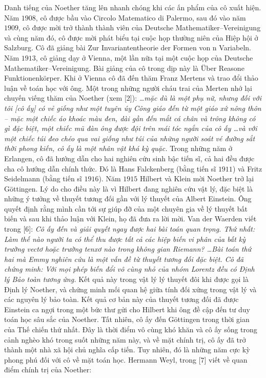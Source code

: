\begin{multicols}{2}
	\vskip 0.05cm
	Danh tiếng của Noether tăng lên nhanh chóng khi các ấn phẩm của cô xuất hiện. Năm $1908$, cô được bầu vào Circolo Matematico di Palermo, sau đó vào năm $1909$, cô được mời trở thành thành viên của Deutsche Mathematiker--Vereinigung và cùng năm đó, cô được mời phát biểu tại cuộc họp thường niên của Hiệp hội ở Salzburg. Cô đã giảng bài Zur Invariantentheorie der Formen von n Variabeln. Năm $1913$, cô giảng dạy ở Vienna, một lần nữa tại một cuộc họp của Deutsche Mathematiker--Vereinigung. Bài giảng của cô trong dịp này là Über Reasone Funktionenkörper. Khi ở Vienna cô đã đến thăm Franz Mertens và trao đổi thảo luận về toán học với ông. Một trong những người cháu trai của Merten nhớ lại chuyến viếng thăm của Noether (xem [$2$]):
	\vskip 0.05cm
	\textit{\ldots mặc dù là một phụ nữ, nhưng đối với tôi [cô ấy] có vẻ giống như một tuyên úy Công giáo đến từ một giáo xứ nông thôn -- mặc một chiếc áo khoác màu đen, dài gần đến mắt cá chân và trông không có gì đặc biệt, một chiếc mũ đàn ông được đội trên mái tóc ngắn của cô ấy \ldots và với một chiếc túi đeo chéo qua vai giống như túi của những người soát vé đường sắt thời phong kiến, cô ấy là một nhân vật khá kỳ quặc.}
	\vskip 0.05cm
	Trong những năm ở Erlangen, cô đã hướng dẫn cho hai nghiên cứu sinh bậc tiến sĩ, cả hai đều được cha cô hướng dẫn chính thức. Đó là Hans Falckenberg (bằng tiến sĩ $1911$) và Fritz Seidelmann (bằng tiến sĩ $1916$).
	\vskip 0.05cm
	Năm $1915$ Hilbert và Klein mời Noether trở lại Göttingen. Lý do cho điều này là vì Hilbert đang nghiên cứu vật lý, đặc biệt là những ý tưởng về thuyết tương đối gần với lý thuyết của Albert Einstein. Ông quyết định rằng mình cần tới sự giúp đỡ của một chuyên gia về lý thuyết bất biến và sau khi thảo luận với Klein, họ đã đưa ra lời mời. Van der Waerden viết trong [$6$]:
	\vskip 0.05cm
	\textit{Cô ấy đến và giải quyết ngay được hai bài toán quan trọng. Thứ nhất: Làm thế nào người ta có thể thu được tất cả các hiệp biến vi phân của bất kỳ trường vectơ hoặc trường tenxơ nào trong không gian Riemann? \ldots Bài toán thứ hai mà Emmy nghiên cứu là một vấn đề từ thuyết tương đối đặc biệt. Cô đã chứng minh: Với mọi phép biến đổi vô cùng nhỏ của nhóm Lorentz đều có Định lý Bảo toàn tương ứng.}
	\vskip 0.05cm
	Kết quả này trong vật lý lý thuyết đôi khi được gọi là Định lý Noether, và chứng minh mối quan hệ giữa tính đối xứng trong vật lý và các nguyên lý bảo toàn. Kết quả cơ bản này của thuyết tương đối đã được Einstein ca ngợi trong một bức thư gửi cho Hilbert khi ông đề cập đến tư duy toán học sâu sắc của Noether. Tất nhiên, cô ấy đến Göttingen trong thời gian của Thế chiến thứ nhất. Đây là thời điểm vô cùng khó khăn và cô ấy sống trong cảnh nghèo khó trong suốt những năm này, và về mặt chính trị, cô ấy đã trở thành một nhà xã hội chủ nghĩa cấp tiến. Tuy nhiên, đó là những năm cực kỳ phong phú đối với cô về mặt toán học. Hermann Weyl, trong [$7$] viết về quan điểm chính trị của Noether:

\end{multicols}
